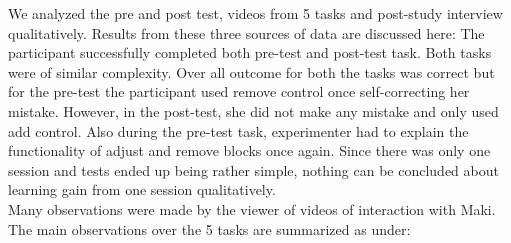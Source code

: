 We analyzed the pre and post test, videos from 5 tasks and post-study interview qualitatively. Results from these three sources of data are discussed here:
The participant successfully completed both pre-test and post-test task. Both tasks were of similar complexity. Over all outcome for both the tasks was correct but for the pre-test the participant used remove control once self-correcting her mistake. However, in the post-test, she did not make any mistake and only used add control. Also during the pre-test task, experimenter had to explain the functionality of adjust and remove blocks once again. Since there was only one session and tests ended up being rather simple, nothing can be concluded about learning gain from one session qualitatively. \\
Many observations were made by the viewer of videos of interaction with Maki. The main observations over the 5 tasks are summarized as under: 
